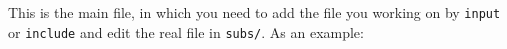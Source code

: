 \documentclass{amsart}
\begin{document}
	This is the main file, in which you need to add the file you working on by \texttt{input} or \texttt{include} and edit the real file in \texttt{subs/}. As an example:
	
\end{document}
